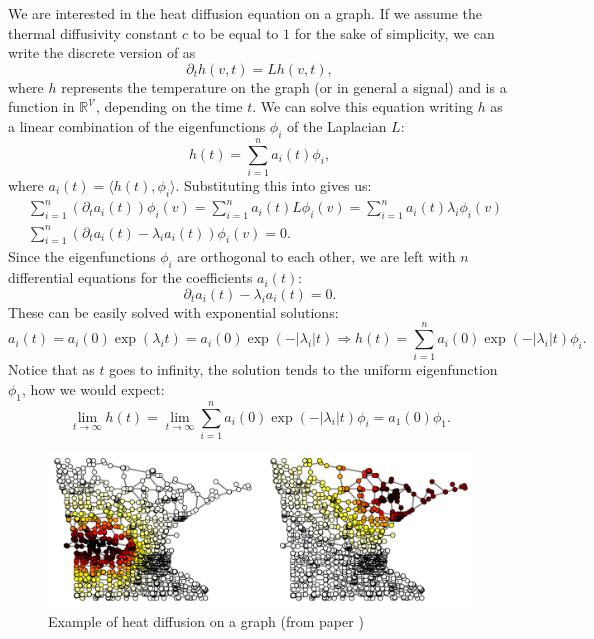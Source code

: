 \documentclass[12pt,a4paper]{report}
\theoremstyle{definition}
\begin{document}
We are interested in the heat diffusion equation on a graph.
If we assume the thermal diffusivity constant $c$ to be equal to $1$ for the sake of simplicity, we can write the discrete version of  as
\begin{equation}
\label{eq:heat_eq_L}
    \partial _t h(v, t) = L h(v, t) ,
\end{equation}
where $h$ represents the temperature on the graph (or in general a signal) and is a function in $\mathbb{R}^{\mathcal{V}}$, depending on the time $t$.
We can solve this equation writing $h$ as a linear combination of the eigenfunctions $\phi _i$ of the Laplacian $L$:
\begin{equation*}
    h (t) = \sum_{i=1} ^ n a_i (t) \phi _i ,
\end{equation*}
where $a_i(t)= \langle h(t), \phi _i \rangle$.
Substituting this into  gives us:
\begin{align*}
    &\sum _{i=1} ^n (\partial _t a_i(t) ) \phi _i(v) = 
    \sum _{i=1} ^n a_i(t) L \phi _i(v) =
    \sum _{i=1} ^n a_i(t) \lambda_i \phi _i(v) \\
    &\sum _{i=1} ^n \left( \partial _t a_i(t) - \lambda _i a_i(t) \right) \phi _i (v) =0 .
\end{align*}
Since the eigenfunctions $\phi _i$ are orthogonal to each other, we are left with $n$ differential equations for the coefficients $a_i(t)$:
\begin{equation*}
    \partial _t a_i(t) - \lambda _i a_i(t) = 0 .
\end{equation*}
These can be easily solved with exponential solutions:
\begin{equation*}
    a_i(t) = a_i (0) \exp (\lambda _i t) = a_i (0) \exp (- |\lambda _i| t) \Longrightarrow h(t) = \sum_{i=1} ^n a_i(0) \exp (- |\lambda _i| t) \phi _i .
\end{equation*}
Notice that as $t$ goes to infinity, the solution tends to the uniform eigenfunction $\phi _1$, how we would expect:
\begin{equation*}
    \lim_{t \to \infty} h(t) = \lim_{t \to \infty} \sum_{i=1} ^n a_i(0) \exp (- |\lambda _i| t) \phi _i =
    a_1(0) \phi_1 .
\end{equation*}

\begin{figure}[b]
    \centering
    \includegraphics[width = 0.8 \textwidth]{Images/heat_diffusion.png}
    \caption{Example of heat diffusion on a graph (from paper \cite{Beyound_eucl_data})}
    \label{fig:heat_diffusion}
\end{figure}
\end{document}
